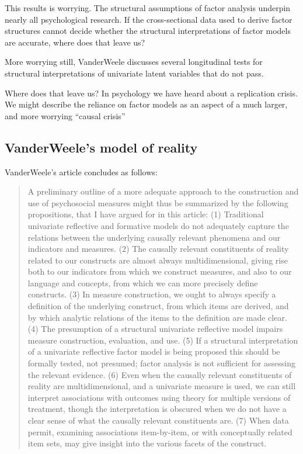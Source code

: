 \documentclass[
  letterpaper,
  DIV=11,
  numbers=noendperiod]{scrartcl}
\begin{document}
This results is worrying. The structural assumptions of factor analysis
underpin nearly all psychological research. If the cross-sectional data
used to derive factor structures cannot decide whether the structural
interpretations of factor models are accurate, where does that leave us?

More worrying still, VanderWeele discusses several longitudinal tests
for structural interpretations of univariate latent variables that do
not pass.

Where does that leave us? In psychology we have heard about a
replication crisis. We might describe the reliance on factor models as
an aspect of a much larger, and more worrying ``causal crisis''

\hypertarget{vanderweeles-model-of-reality}{%
\subsection{VanderWeele's model of
reality}\label{vanderweeles-model-of-reality}}

VanderWeele's article concludes as follows:

\begin{quote}
A preliminary outline of a more adequate approach to the construction
and use of psychosocial measures might thus be summarized by the
following propositions, that I have argued for in this article: (1)
Traditional univariate reflective and formative models do not adequately
capture the relations between the underlying causally relevant phenomena
and our indicators and measures. (2) The causally relevant constituents
of reality related to our constructs are almost always multidimensional,
giving rise both to our indicators from which we construct measures, and
also to our language and concepts, from which we can more precisely
define constructs. (3) In measure construction, we ought to always
specify a definition of the underlying construct, from which items are
derived, and by which analytic relations of the items to the definition
are made clear. (4) The presumption of a structural univariate
reflective model impairs measure construction, evaluation, and use. (5)
If a structural interpretation of a univariate reflective factor model
is being proposed this should be formally tested, not presumed; factor
analysis is not sufficient for assessing the relevant evidence. (6) Even
when the causally relevant constituents of reality are multidimensional,
and a univariate measure is used, we can still interpret associations
with outcomes using theory for multiple versions of treatment, though
the interpretation is obscured when we do not have a clear sense of what
the causally relevant constituents are. (7) When data permit, examining
associations item-by-item, or with conceptually related item sets, may
give insight into the various facets of the construct.
\end{quote}
\end{document}
